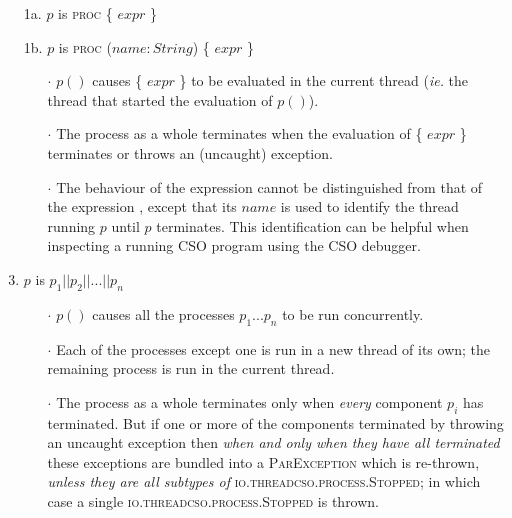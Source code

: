 \documentclass[12pt]{IOS-Book-Article-CPA-2017}
\begin{document}
\begin{enumerate}
\item[1a.] $p$ is \textsc{proc} \{ $expr$ \} \label{simple}
\item[1b.] $p$ is \textsc{proc} (\(name: String\)) \{ \(expr\) \}
\begin{itemize}
        \item[$\cdot$] $p()$ causes \{ $expr$ \} to be evaluated in the current thread (\textit{ie.} the thread that started the evaluation of $p()$).
        \item[$\cdot$] The process as a whole terminates when 
                       the evaluation of \{ $expr$ \} terminates
                       or throws an (uncaught) exception.
        
        \item[$\cdot$] The 
        behaviour of the expression  
        cannot be distinguished from 
        that of the expression , except that
        its $name$ is used to identify the thread running $p$ until
        $p$ terminates. This identification can be helpful when 
        inspecting a running CSO program using the CSO debugger.
\end{itemize}

\item $p$ is $p_1 \mathrel{||} p_2 \mathrel{||} ... \mathrel{||} p_n$ 
\begin{itemize}
        \item[$\cdot$] $p()$ causes all the processes $p_1 ... p_n$ to be run concurrently.
        \item[$\cdot$] Each of the processes except one is run in a new thread of its own;         
        the remaining process is run in the current thread.      
        \item[$\cdot$] The process as a whole terminates only  
                       when \textit{every} component  $p_i$ 
                       has terminated. But
              if one or more of the components
              terminated by throwing an uncaught exception then
              \textit{when and only when they have all terminated}
              these exceptions are bundled into a \textsc{ParException}
              which is re-thrown, \textit{unless they are all subtypes of} 
              \textsc{io.threadcso.process.Stopped}; in which case a single \textsc{io.threadcso.process.Stopped}
              is thrown.
              
\end{itemize}
\end{enumerate}
\end{document}
